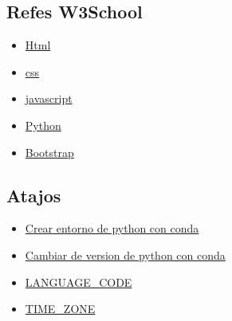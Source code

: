 \documentclass[10pt]{article}
\begin{document}
\subsection{Refes W3School}
\begin{itemize}
\item {\textcolor{B}{\href{https://www.w3schools.com/html/}{Html}}}

\item {\textcolor{B}{\href{https://www.w3schools.com/css/default.asp}{css}}}

\item {\textcolor{B}{\href{https://www.w3schools.com/js/default.asp}{javascript}}}

\item {\textcolor{B}{\href{https://www.w3schools.com/python/default.asp}{Python}}}

\item {\textcolor{B}{\href{https://www.w3schools.com/bootstrap/bootstrap_ver.asp}{Bootstrap}}}
\end{itemize}

\subsection{Atajos}

\begin{itemize}
\item {\textcolor{B}{\href{https://conda.io/projects/conda/en/latest/user-guide/tasks/manage-environments.html\#creating-an-environment-with-commands}{Crear entorno de python con conda}}}


\item {\textcolor{B}{\href{https://unipython.com/cambiar-tu-version-de-python-con-anaconda/}{Cambiar de version de python con conda}}}


\item {\textcolor{B}{\href{http://www.i18nguy.com/unicode/language-identifiers.html}{LANGUAGE\_CODE}}}

\item {\textcolor{B}{\href{https://en.wikipedia.org/wiki/List_of_tz_database_time_zones}{TIME\_ZONE}}}


\end{itemize}
\end{document}

